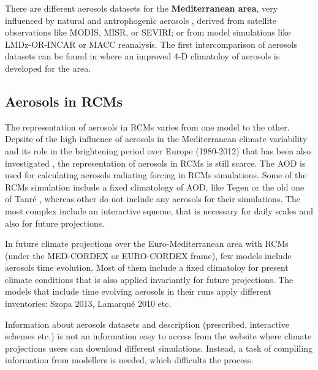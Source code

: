 There are different aerosols datasets for the \textbf{Mediterranean area}, very influenced by natural and antrophogenic aerosols \cite*{Lelieveld}, derived from satellite observations like MODIS, MISR, or SEVIRI; or from model simulations like LMDz-OR-INCAR or MACC reanalysis. The first intercomparison of aerosols datasets can be found in \cite*{Nabat2013} where an improved 4-D climatoloy of aerosols is developed for the area.

\subsection{Aerosols in RCMs}

The representation of aerosols in RCMs varies from one model to the other. Depsite of the high influence of aerosols in the Mediterranean climate variability \cite*{Nabat2015} and its role in the brightening period over Europe (1980-2012) that has been also investigated \cite*{Nabat2015, Nabat2015a, Wild2009}, the representation of aerosols in RCMs is still scarce. The AOD is used for calculating aerosols radiating forcing in RCMs simulations. Some of the RCMs simulation include a fixed climatology of AOD, like Tegen or the old one of Tanré \cite*{Tegen1997, Tanre1984}, whereas other do not include any aerosols for their simulations. The most complex include an interactive squeme, that is necessary for daily scales and also for future projections.


In future climate projections over the Euro-Mediterranean area with RCMs (under the MED-CORDEX or EURO-CORDEX frame), few models include aerosols time evolution. Most of them include a fixed climatoloy for present climate conditions that is also applied invariantly for future projections. The models that include time evolving aerosols in their runs apply different inventories: Szopa 2013, Lamarqué 2010 etc.

Information about aerosols datasets and description (prescribed, interactive schemes etc.) is not an information easy to access from the website where climate projections users can download different simulations. Instead, a task of compliling information from modellers is needed, which difficults the process. %

